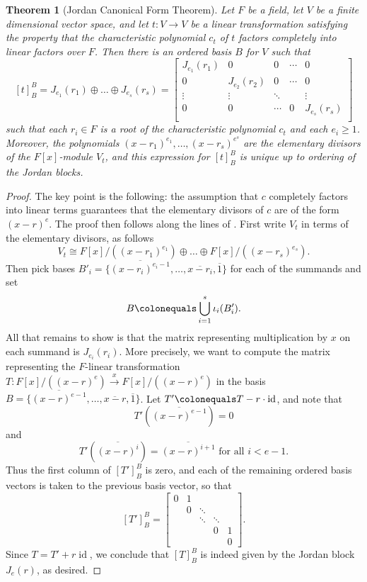 \documentclass[12pt]{report}
\newtheorem{theorem}{Theorem}[chapter]
\numberwithin{equation}{section}
\numberwithin{theorem}{chapter}
\theoremstyle{definition}
\newtheorem*{basic properties}{Basic Properties}
\newtheorem*{Important Remark}{Important Remark}
\DeclareMathOperator{\id}{id}
\begin{document}
\begin{theorem}[Jordan Canonical Form Theorem]\label{JCF}
Let $F$ be a field, let $V$ be a finite dimensional vector space, and let $t: V \to V$ be a linear transformation satisfying the property that the characteristic polynomial $c_t$ of $t$ factors completely into linear factors over $F$. Then there is an ordered basis $B$ for $V$ such that 
$$[t]_B^B = J_{e_1}(r_1) \oplus \dots \oplus J_{e_s}(r_s)=
\begin{bmatrix}
J_{e_1}(r_1) & 0 & 0 & \cdots & 0 \\
0 &  J_{e_2}(r_2)  & 0 & \cdots & 0 \\
\vdots & \vdots & \ddots &  & \vdots \\
0 & 0 & \cdots & 0 &  J_{e_s}(r_s) \\
\end{bmatrix}$$ 
such that each $r_i \in F$ is a root of the characteristic polynomial $c_t$ and each $e_i \geqslant 1$. Moreover, the polynomials $(x - r_1)^{e_1},\ldots,(x - r_s)^{e^s}$ are the elementary divisors of the $F[x]$-module $V_t$, and this expression for $[t]_B^B$ is unique up to ordering of the Jordan blocks.
\end{theorem}
 
 
\begin{proof}
The key point is the following: the assumption that $c$ completely factors into linear terms guarantees that the elementary divisors of $c$ are of the form $(x-r)^e$.
The proof then follows along the lines of . 
First write $V_t$ in terms of the elementary divisors, as follows $$V_t\cong F[x]/((x - r_1)^{e_1})\oplus \dots \oplus F[x]/((x - r_s)^{e_s}).$$
Then pick bases $B'_i=\{\overline{(x-r_i)^{e_i-1}}, \ldots, \overline{x-r_i}, \overline{1}\}$ for each of the summands and set 
$$B \colonequals \bigcup_{i=1}^s \iota_i(B'_i).$$
All that remains to show is that the matrix representing multiplication by $x$ on each summand is $J_{e_i}(r_i)$. More precisely, we want to compute the matrix representing the $F$-linear transformation $T\!: F[x]/((x-r)^e) \xrightarrow{x} F[x]/((x-r)^e)$ in the basis $B = \{\overline{(x-r)^{e-1}}, \ldots, \overline{x-r}, \overline{1}\}$. Let $T' \colonequals T - r \cdot \id$, and note that
$$T'(\overline{(x-r)^{e-1}}) = 0$$
and
$$T'(\overline{(x-r)^{i}}) = \overline{(x-r)^{i+1}} \textrm{ for all } i < e-1.$$
Thus the first column of $[T']_B^B$ is zero, and each of the remaining ordered basis vectors is taken to the previous basis vector, so that
$$[T']_B^B = \begin{bmatrix}
0 & 1 &  \\
& 0 & \ddots \\
& & \ddots & \ddots\\
& & & 0 & 1\\
&&&& 0	
\end{bmatrix}.
$$
Since $T = T' + r \id$, we conclude that $[T]_B^B$ is indeed given by the Jordan block $J_{e}(r)$, as desired.
\end{proof}
\end{document}
